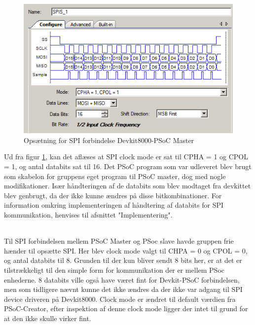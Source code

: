 \begin{figure}[H]
	\includegraphics[scale=0.6]{tex/Design/SPI/Clock_mode_SPI}
	\caption{Opsætning for SPI forbindelse Devkit8000-PSoC Master}
	\label{SPI_opsaetning}
\end{figure}

Ud fra figur \ref{SPI_opsaetning}, kan det aflæses at SPI clock mode er sat til CPHA = 1 og CPOL = 1, og antal databits sat til 16. Det PSoC program som var 
udleveret blev brugt som skabelon for gruppens eget program til PSoC master, dog med nogle modifikationer. Især håndteringen af de databits som blev modtaget 
fra devkittet blev genbrugt, da der ikke kunne ændres på disse bitkombinationer. For information omkring implementeringen af håndtering af databits for SPI 
kommunikation, henvises til afsnittet "Implementering".

\\
Til SPI forbindelsen mellem PSoC Master og PSoc slave havde gruppen frie hænder til opsætte SPI. Her blev clock mode valgt til CHPA = 0 og CPOL = 0, og 
antal databits til 8. Grunden til der kun bliver sendt 8 bits her, er at det er tilstrækkeligt til den simple form for kommunikation der er mellem PSoc enhederne.
8 databits ville også have været fint for Devkit-PSoC forbindelsen, men som tidligere nævnt kunne det ikke ændres da der ikke var adgang til SPI device driveren
på Devkit8000. Clock mode er ændret til default værdien fra PSoC-Creator, efter inspektion af denne clock mode ligger der intet til grund for at den ikke
skulle virker fint. 
